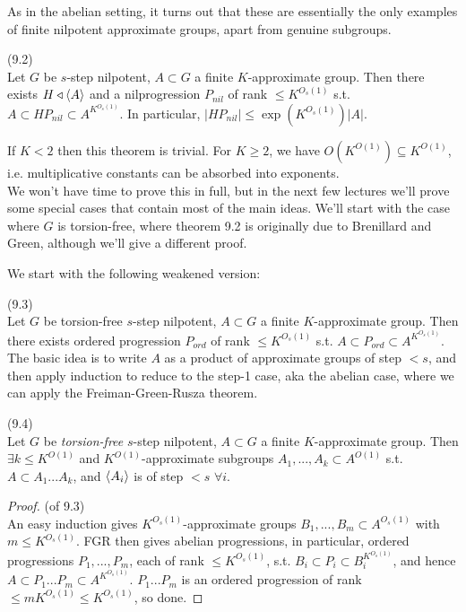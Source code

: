 \documentclass[a4paper]{article}
\begin{document}
As in the abelian setting, it turns out that these are essentially the only examples of finite nilpotent approximate groups, apart from genuine subgroups.

\begin{thm} (9.2)\\
Let $G$ be $s$-step nilpotent, $A \subset G$ a finite $K$-approximate group. Then there exists $H \triangleleft \langle A \rangle$ and a nilprogression $P_{nil}$ of rank $\leq K^{O_s(1)}$ s.t.$A \subset HP_{nil} \subset A^{K^{O_s(1)}}$. In particular, $|HP_{nil}| \leq \exp(K^{O_s(1)})|A|$.
\begin{rem}
If $K<2$ then this theorem is trivial. For $K \geq 2$, we have $O(K^{O(1)}) \subseteq K^{O(1)}$, i.e. multiplicative constants can be absorbed into exponents.\\
We won't have time to prove this in full, but in the next few lectures we'll prove some special cases that contain most of the main ideas. We'll start with the case where $G$ is torsion-free, where theorem 9.2 is originally due to Brenillard and Green, although we'll give a different proof.
\end{rem}
\end{thm}

We start with the following weakened version:

\begin{thm} (9.3)\\
Let $G$ be torsion-free $s$-step nilpotent, $A \subset G$ a finite $K$-approximate group. Then there exists ordered progression $P_{ord}$ of rank $\leq K^{O_s(1)}$ s.t. $A \subset P_{ord} \subset A^{K^{O_s(1)}}$.\\
The basic idea is to write $A$ as a product of approximate groups of step $<s$, and then apply induction to reduce to the step-1 case, aka the abelian case, where we can apply the Freiman-Green-Rusza theorem.
\end{thm}

\begin{prop} (9.4)\\
Let $G$ be \emph{torsion-free} $s$-step nilpotent, $A \subset G$ a finite $K$-approximate group. Then $\exists k \leq K^{O(1)}$ and $K^{O(1)}$-approximate subgroups $A_1,...,A_k \subset A^{O(1)}$ s.t. $A \subset A_1...A_k$, and $\langle A_i \rangle$ is of step $<s$ $\forall i$.
\end{prop}

\begin{proof} (of 9.3)\\
An easy induction gives $K^{O_s(1)}$-approximate groups $B_1,...,B_m \subset A^{O_s(1)}$ with $m \leq K^{O_s(1)}$. FGR then gives abelian progressions, in particular, ordered progressions $P_1,...,P_m$, each of rank $\leq K^{O_s(1)}$, s.t. $B_i \subset P_i \subset B_i^{K^{O_s(1)}}$, and hence $A \subset P_1...P_m \subset A^{K^{O_s(1)}}$. $P_1...P_m$ is an ordered progression of rank $\leq mK^{O_s(1)} \leq K^{O_s(1)}$, so done.
\end{proof}
\end{document}
